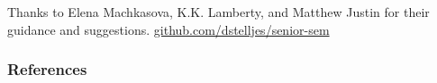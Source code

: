 \documentclass[aspectratio=1610]{beamer}
\begin{document}
  \begin{frame}[standout]
    \centering
    Thanks to Elena Machkasova, K.K. Lamberty, and Matthew Justin for their guidance and suggestions.
    \vfill
    \href{https://github.com/dstelljes/senior-sem}{github.com/dstelljes/senior-sem}
    \vfill
    \ccbyncsa{}
  \end{frame}

  \appendix{}

  \begin{frame}[allowframebreaks]
    \frametitle{References}

    \printbibliography{}
  \end{frame}
\end{document}
